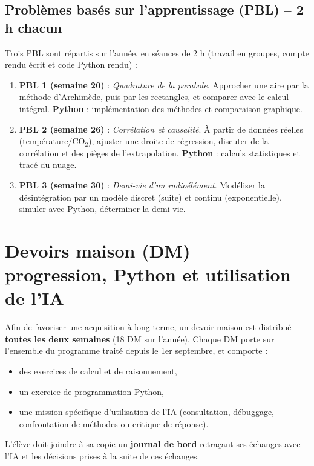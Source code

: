\documentclass[a4paper,12pt]{article}
\begin{document}
	\subsection{Problèmes basés sur l’apprentissage (PBL) – 2 h chacun}
	Trois PBL sont répartis sur l’année, en séances de 2 h (travail en groupes, compte rendu écrit et code Python rendu) :
	
	\begin{enumerate}
		\item \textbf{PBL 1 (semaine 20)} : \emph{Quadrature de la parabole}. Approcher une aire par la méthode d’Archimède, puis par les rectangles, et comparer avec le calcul intégral. \textbf{Python} : implémentation des méthodes et comparaison graphique.
		\item \textbf{PBL 2 (semaine 26)} : \emph{Corrélation et causalité}. À partir de données réelles (température/CO$_2$), ajuster une droite de régression, discuter de la corrélation et des pièges de l’extrapolation. \textbf{Python} : calculs statistiques et tracé du nuage.
		\item \textbf{PBL 3 (semaine 30)} : \emph{Demi-vie d’un radioélément}. Modéliser la désintégration par un modèle discret (suite) et continu (exponentielle), simuler avec Python, déterminer la demi-vie.
	\end{enumerate}
	
	\section{Devoirs maison (DM) -- progression, Python et utilisation de l’IA}
	
	Afin de favoriser une acquisition à long terme, un devoir maison est distribué \textbf{toutes les deux semaines} (18 DM sur l’année).  
	Chaque DM porte sur l’ensemble du programme traité depuis le 1er septembre, et comporte :
	\begin{itemize}
		\item des exercices de calcul et de raisonnement,
		\item un exercice de programmation Python,
		\item une mission spécifique d’utilisation de l’IA (consultation, débuggage, confrontation de méthodes ou critique de réponse).
	\end{itemize}
	
	L’élève doit joindre à sa copie un \textbf{journal de bord} retraçant ses échanges avec l’IA et les décisions prises à la suite de ces échanges.
	
\end{document}
